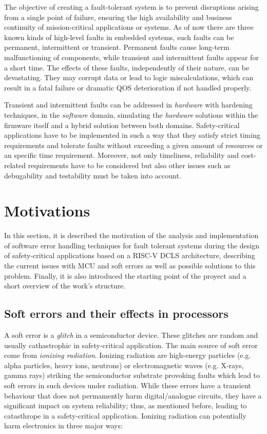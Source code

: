 \documentclass[10pt, a4paper]{report}
\begin{document}
The objective of creating a fault-tolerant system is to prevent disruptions
arising from a single point of failure, ensuring the high availability and
business continuity of mission-critical applications or systems. As of now there
are three known kinds of high-level faults in embedded systems, such faults can 
be permanent, intermittent or transient. Permanent faults cause long-term 
malfunctioning of components, while transient and intermittent faults appear for 
a short time. The effects of these faults, independently of their nature, can be 
devastating. They may corrupt data or lead to logic miscalculations, which can 
result in a fatal failure or dramatic \acrshort{QOS} deterioration if not 
handled properly. 

Transient and intermittent faults can be addressed in \emph{hardware} with
hardening techniques, in the \emph{software} domain, simulating the
\emph{hardware} solutions within the firmware itself and a hybrid solution
between both domains. Safety-critical applications have to be implemented in 
such a way that they satisfy strict timing requirements and tolerate faults 
without exceeding a given amount of resources or an specific time requirement. 
Moreover, not only timeliness, reliability and cost-related requirements have to 
be considered but also other issues such as debugability and testability must be
taken into account.

\section{Motivations}

In this section, it is described the motivation of the analysis and 
implementation of software error handling techniques for fault tolerant systems 
during the design of safety-critical applications based on a RISC-V 
\acrshort{DCLS} architecture, describing the current issues with \acrshort{MCU} 
and soft errors as well as possible solutions to this problem. Finally, it is 
also introduced the starting point of the proyect and a short overview of the 
work's structure.

\subsection{Soft errors and their effects in processors}

A soft error is a \emph{glitch} in a semiconductor device. These glitches are
random and usually cathastrophic in safety-critical application. The main source
of soft error come from \emph{ionizing radiation}. Ionizing radiation are
high-energy particles (e.g. alpha particles, heavy ions, neutrons) or
electromagnetic waves (e.g. X-rays, gamma rays) striking the semiconductor
substrate provoking faults which lead to soft errors in such devices under
radiation. While these errors have a transient behaviour that does not
permamently harm digital/analogue circuits, they have a significant impact on
system reliability; thus, as mentioned before, leading to catasthrope in a
safety-critical application. Ionizing radiation can potentially harm electronics
in three major ways:
\end{document}

